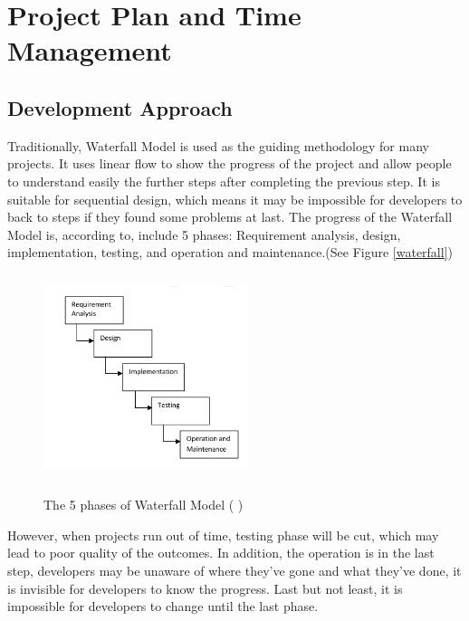 \clearpage
\section{Project Plan and Time Management}

 

\subsection{Development Approach}

Traditionally, Waterfall Model is used as the guiding methodology for many projects. It uses linear flow to show the progress of the project and allow people to understand easily the further steps after completing the previous step. It is suitable for sequential design, which means it may be impossible for developers to back to steps if they found some problems at last. 
The progress of the Waterfall Model is, according to\cite{Adenowo2013}, include 5 phases: Requirement analysis, design, implementation, testing, and operation and maintenance.(See Figure \ref{waterfall})

\begin{figure}[h]
	\centering	
	\includegraphics[width=6cm, height=6cm]{Figs/Waterfall-Model}\\[1ex]
	\caption{The 5 phases of Waterfall Model ( \cite{Adenowo2013})}
	\label{fig:waterfall}
\end{figure}

However, when projects run out of time, testing phase will be cut, which may lead to poor quality of the outcomes. In addition, the operation is in the last step, developers may be unaware of where they’ve gone and what they’ve done, it is invisible for developers to know the progress. Last but not least, it is impossible for developers to change until the last phase.

